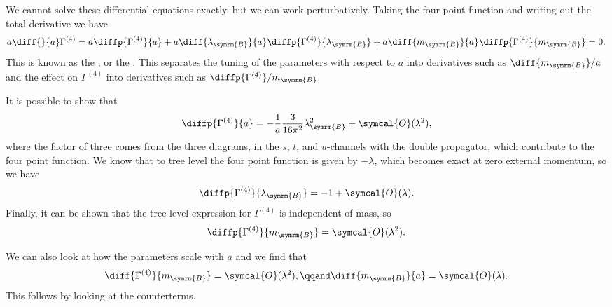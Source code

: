 \documentclass[fleqn]{NotesClass}
\newcommand{\bare}{\symrm{B}}
\newcommand{\order}{\symcal{O}}
\begin{document}
    We cannot solve these differential equations exactly, but we can work perturbatively.
    Taking the four point function and writing out the total derivative we have
    \begin{equation}
        a\diff{}{a}\Gamma^{(4)} = a\diffp{\Gamma^{(4)}}{a} + a\diff{\lambda_\bare}{a}\diffp{\Gamma^{(4)}}{\lambda_\bare} + a\diff{m_\bare}{a}\diffp{\Gamma^{(4)}}{m_\bare} = 0.
    \end{equation}
    This is known as the , or the .
    This separates the tuning of the parameters with respect to \(a\) into derivatives such as \(\diff{m_{\bare}}/{a}\) and the effect on \(\Gamma^{(4)}\) into derivatives such as \(\diffp{\Gamma^{(4)}}/{m_\bare}\).
    
    It is possible to show that
    \begin{equation}
        \diffp{\Gamma^{(4)}}{a} = -\frac{1}{a} \frac{3}{16\pi^2}\lambda_{\bare}^2 + \order(\lambda^2),
    \end{equation}
    where the factor of three comes from the three diagrams, in the \(s\), \(t\), and \(u\)-channels with the double propagator, which contribute to the four point function.
    We know that to tree level the four point function is given by \(-\lambda\), which becomes exact at zero external momentum, so we have
    \begin{equation}
        \diffp{\Gamma^{(4)}}{\lambda_{\bare}} = -1 + \order(\lambda).
    \end{equation}
    Finally, it can be shown that the tree level expression for \(\Gamma^{(4)}\) is independent of mass, so
    \begin{equation}
        \diffp{\Gamma^{(4)}}{m_{\bare}} = \order(\lambda^2).
    \end{equation}
    
    We can also look at how the parameters scale with \(a\) and we find that
    \begin{equation}
        \diff{\Gamma^{(4)}}{m_\bare} = \order(\lambda^2), \qqand \diff{m_\bare}{a} = \order(\lambda).
    \end{equation}
    This follows by looking at the counterterms.
    
\end{document}
